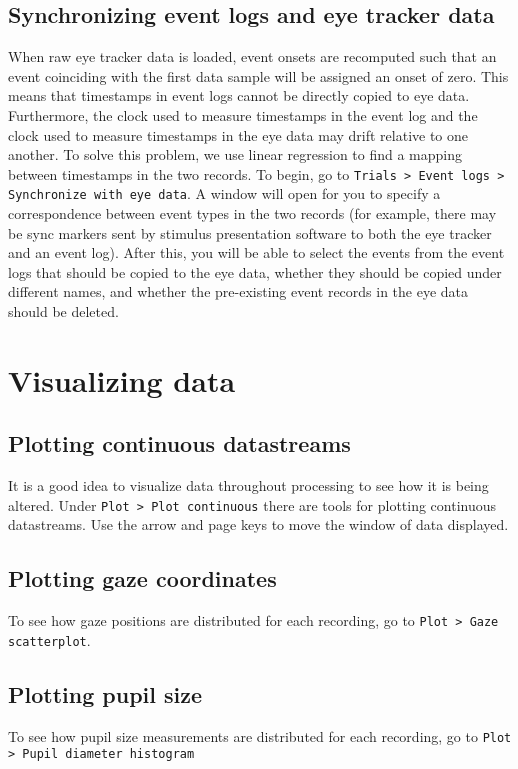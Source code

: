 \documentclass{article}
\begin{document}
\subsection{Synchronizing event logs and eye tracker data}
When raw eye tracker data is loaded, event onsets are recomputed such that an event coinciding with the first data sample will be assigned an onset of zero. This means that timestamps in event logs cannot be directly copied to eye data. Furthermore, the clock used to measure timestamps in the event log and the clock used to measure timestamps in the eye data may drift relative to one another. To solve this problem, we use linear regression to find a mapping between timestamps in the two records. To begin, go to \texttt{Trials > Event logs > Synchronize with eye data}. A window will open for you to specify a correspondence between event types in the two records (for example, there may be sync markers sent by stimulus presentation software to both the eye tracker and an event log). After this, you will be able to select the events from the event logs that should be copied to the eye data, whether they should be copied under different names, and whether the pre-existing event records in the eye data should be deleted.
\section{Visualizing data}
\subsection{Plotting continuous datastreams}
It is a good idea to visualize data throughout processing to see how it is being altered. Under \texttt{Plot > Plot continuous} there are tools for plotting continuous datastreams.  Use the arrow and page keys to move the window of data displayed.
\subsection{Plotting gaze coordinates}
To see how gaze positions are distributed for each recording, go to \texttt{Plot > Gaze scatterplot}.
\subsection{Plotting pupil size}
To see how pupil size measurements are distributed for each recording, go to \texttt{Plot > Pupil diameter histogram}
\end{document}
